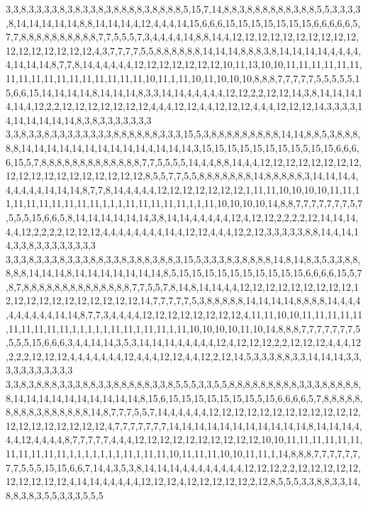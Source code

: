3,3,8,3,3,3,3,8,3,8,3,3,8,3,8,8,8,8,3,8,8,8,8,5,15,7,14,8,8,3,8,8,8,8,8,8,3,8,8,5,5,3,3,3,3,8,14,14,14,14,14,8,8,14,14,14,4,12,4,4,4,14,15,6,6,6,15,15,15,15,15,15,15,6,6,6,6,6,5,7,7,8,8,8,8,8,8,8,8,8,8,7,7,5,5,5,7,3,4,4,4,4,14,8,8,14,4,12,12,12,12,12,12,12,12,12,12,12,12,12,12,12,12,12,4,3,7,7,7,7,5,5,8,8,8,8,8,8,14,14,14,8,8,8,3,8,14,14,14,14,4,4,4,4,4,14,14,14,8,7,7,8,14,4,4,4,4,4,12,12,12,12,12,12,12,10,11,13,10,10,11,11,11,11,11,11,11,11,11,11,11,11,11,11,11,11,11,10,11,1,11,10,11,10,10,10,8,8,8,7,7,7,7,7,5,5,5,5,5,15,6,6,15,14,14,14,14,8,14,14,14,8,3,3,14,14,4,4,4,4,4,12,12,2,2,12,12,14,3,8,14,14,14,14,14,4,12,2,2,12,12,12,12,12,12,12,4,4,4,12,12,4,4,12,12,12,4,4,4,12,12,12,14,3,3,3,3,14,14,14,14,14,14,8,3,8,3,3,3,3,3,3,3
3,3,8,3,3,8,3,3,3,3,3,3,3,3,8,8,8,8,8,8,3,3,3,15,5,3,8,8,8,8,8,8,8,8,8,14,14,8,8,5,3,8,8,8,8,8,14,14,14,14,14,14,14,14,14,14,4,14,14,14,3,15,15,15,15,15,15,15,15,5,15,15,6,6,6,6,15,5,7,8,8,8,8,8,8,8,8,8,8,8,8,8,7,7,5,5,5,5,14,4,4,8,8,14,4,4,12,12,12,12,12,12,12,12,12,12,12,12,12,12,12,12,12,12,12,8,5,5,7,7,5,5,8,8,8,8,8,8,8,14,8,8,8,8,8,3,14,14,14,4,4,4,4,4,4,14,14,14,8,7,7,8,14,4,4,4,4,12,12,12,12,12,12,12,1,11,11,10,10,10,10,11,11,11,11,11,11,11,11,11,11,1,1,1,11,11,11,11,11,1,1,11,10,10,10,10,14,8,8,7,7,7,7,7,7,7,5,7,5,5,5,15,6,6,5,8,14,14,14,14,14,14,3,8,14,14,4,4,4,4,4,12,4,12,12,2,2,2,2,12,14,14,14,4,4,12,2,2,2,2,12,12,12,4,4,4,4,4,4,4,4,14,4,12,12,4,4,4,12,2,12,3,3,3,3,3,8,8,14,4,14,14,3,3,8,3,3,3,3,3,3,3,3
3,3,3,8,3,3,3,8,3,3,3,8,8,3,3,8,3,8,8,3,8,8,3,15,5,3,3,3,8,3,8,8,8,8,14,8,14,8,3,5,3,3,8,8,8,8,8,14,14,14,8,14,14,14,14,14,14,14,8,5,15,15,15,15,15,15,15,15,15,15,6,6,6,6,15,5,7,8,7,8,8,8,8,8,8,8,8,8,8,8,8,8,8,7,7,5,5,7,8,14,8,14,14,4,4,12,12,12,12,12,12,12,12,12,12,12,12,12,12,12,12,12,12,12,12,14,7,7,7,7,7,5,3,8,8,8,8,8,14,14,14,14,8,8,8,8,14,4,4,4,4,4,4,4,4,4,14,14,8,7,7,3,4,4,4,4,12,12,12,12,12,12,12,12,4,11,11,10,10,11,11,11,11,11,11,11,11,11,11,1,1,1,1,1,11,11,1,11,11,1,11,10,10,10,10,11,10,14,8,8,8,7,7,7,7,7,7,7,5,5,5,5,15,6,6,6,3,4,4,14,14,3,5,3,14,14,14,4,4,4,4,4,12,4,12,12,12,2,2,12,12,12,4,4,4,12,2,2,2,12,12,12,4,4,4,4,4,4,4,12,4,4,4,12,12,4,4,12,2,12,14,5,3,3,3,8,8,3,3,14,14,14,3,3,3,3,3,3,3,3,3,3,3
3,3,8,3,8,8,8,3,3,3,8,8,3,3,8,8,8,8,8,3,3,8,5,5,5,3,3,5,5,8,8,8,8,8,8,8,8,8,3,3,3,8,8,8,8,8,8,14,14,14,14,14,14,14,14,14,14,8,15,6,15,15,15,15,15,15,15,5,15,6,6,6,6,5,7,8,8,8,8,8,8,8,8,8,3,8,8,8,8,8,8,14,8,7,7,7,5,5,7,14,4,4,4,4,4,12,12,12,12,12,12,12,12,12,12,12,12,12,12,12,12,12,12,12,12,4,7,7,7,7,7,7,7,14,14,14,14,14,14,14,14,14,14,14,8,14,14,14,4,4,4,12,4,4,4,4,8,7,7,7,7,7,4,4,4,12,12,12,12,12,12,12,12,12,12,10,10,11,11,11,11,11,11,11,11,11,11,11,1,1,1,1,1,1,1,11,1,11,11,10,11,11,11,10,10,11,11,1,14,8,8,8,7,7,7,7,7,7,7,7,5,5,5,15,15,6,6,7,14,4,3,5,3,8,14,14,14,4,4,4,4,4,4,4,4,12,12,12,2,2,12,12,12,12,12,12,12,12,12,12,4,14,14,4,4,4,4,4,12,12,12,4,12,12,12,12,12,2,12,8,5,5,5,3,3,8,8,3,3,14,8,8,3,8,3,5,5,3,3,3,5,5,5
